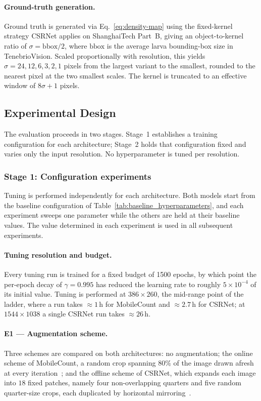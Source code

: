 \documentclass[conference]{IEEEtran}
\begin{document}
\paragraph{Ground-truth generation.}
Ground truth is generated via Eq.~\eqref{eq:density-map} using the fixed-kernel
strategy CSRNet
applies on ShanghaiTech Part~B, giving an object-to-kernel ratio of
$\sigma = \mathrm{bbox}/2$, where $\mathrm{bbox}$ is the average larva
bounding-box size in TenebrioVision. Scaled proportionally with resolution, this
yields $\sigma = 24, 12, 6, 3, 2, 1$ pixels from the largest variant to the
smallest, rounded to the nearest pixel at the two smallest scales. The kernel is
truncated to an effective window of $8\sigma + 1$ pixels.

\subsection{Experimental Design}

The evaluation proceeds in two stages. Stage~1 establishes a training
configuration for each architecture; Stage~2 holds that configuration fixed and
varies only the input resolution. No hyperparameter is tuned per resolution.

\subsubsection{Stage 1: Configuration experiments}

Tuning is performed independently for each architecture. Both models start from
the baseline configuration of Table~\ref{tab:baseline_hyperparameters}, and each
experiment sweeps one parameter while the others are held at their baseline
values. The value determined in each experiment is used in all subsequent
experiments.

\paragraph{Tuning resolution and budget.}
Every tuning run is trained for a fixed budget of 1500 epochs, by which point
the per-epoch decay of $\gamma = 0.995$ has reduced the learning rate to roughly
$5\times10^{-4}$ of its initial value. Tuning is performed at $386\times260$,
the mid-range point of the ladder, where a run takes ${\approx}1$\,h for
MobileCount and ${\approx}2.7$\,h for CSRNet; at $1544\times1038$ a single
CSRNet run takes ${\approx}26$\,h.

\paragraph{E1 --- Augmentation scheme.}
Three schemes are compared on both architectures: no augmentation; the online
scheme of MobileCount, a random crop spanning $80\%$ of the image drawn afresh
at every iteration~\cite{wang2020mobilecount}; and the offline scheme of CSRNet,
which expands each image into $18$ fixed patches, namely four non-overlapping
quarters and five random quarter-size crops, each duplicated by horizontal
mirroring~\cite{li2018csrnet}.
\end{document}
